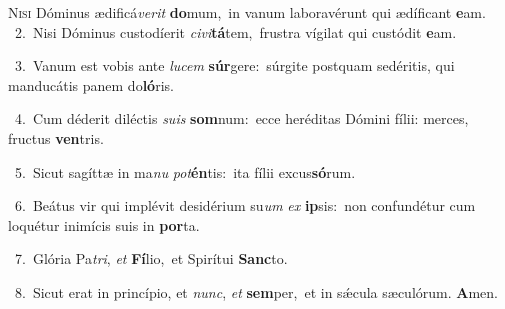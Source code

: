 \lettrine{\initial\textcolor{\initialcolor}{N}}{isi} Dóminus ædificá\-\textit{ve}\-\textit{rit} \textbf{do}\-mum,~\star in vanum laboravérunt qui ædíficant \textbf{e}\-am.\\
{\numbfont\textcolor{\numbcolor}{~2.}}~Nisi Dóminus custodíerit \textit{ci}\-\textit{vi}\textbf{tá}tem,~\star frustra vígilat qui custódit \textbf{e}\-am.\par
{\numbfont\textcolor{\numbcolor}{~3.}}~Vanum est vobis ante \textit{lu}\-\textit{cem} \textbf{súr}\-gere:~\star súrgite postquam sedéritis, qui manducátis panem do\-\textbf{ló}\-ris.\par
{\numbfont\textcolor{\numbcolor}{~4.}}~Cum déderit diléctis \textit{su}\-\textit{is} \textbf{som}\-num:~\star ecce heréditas Dómini fílii: merces, fructus \textbf{ven}\-tris.\par
{\numbfont\textcolor{\numbcolor}{~5.}}~Sicut sagíttæ in ma\textit{nu} \textit{pot}\-\textbf{én}tis:~\star ita fílii excus\-\textbf{só}\-rum.\par
{\numbfont\textcolor{\numbcolor}{~6.}}~Beátus vir qui implévit desidérium su\textit{um} \textit{ex} \textbf{ip}\-sis:~\star non confundétur cum loquétur inimícis suis in \textbf{por}\-ta.\par
{\numbfont\textcolor{\numbcolor}{~7.}}~Glória Pa\-\textit{tri}\-, \textit{et} \textbf{Fí}\-lio,~\star et Spirítui \textbf{Sanc}\-to.\par
{\numbfont\textcolor{\numbcolor}{~8.}}~Sicut erat in princípio, et \textit{nunc}\-, \textit{et} \textbf{sem}\-per,~\star et in sǽcula sæculórum. \textbf{A}\-men.\par
